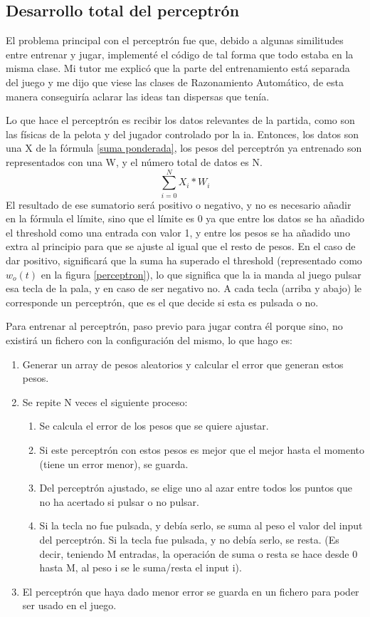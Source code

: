 \subsection{Desarrollo total del perceptrón}
El problema principal con el perceptrón fue que, debido a algunas similitudes entre entrenar y jugar, implementé el código de tal forma que todo estaba en la misma clase. Mi tutor me explicó que la parte del entrenamiento está separada del juego y me dijo que viese las clases de Razonamiento Automático, de esta manera conseguiría aclarar las ideas tan dispersas que tenía.

Lo que hace el perceptrón es recibir los datos relevantes de la partida, como son las físicas de la pelota y del jugador controlado por la \gls{ia}. Entonces, los datos son una X de la fórmula \ref{suma ponderada}, los pesos del perceptrón ya entrenado son representados con una W, y el número total de datos es N.
\begin{equation}
	\sum_{i=0}^NX_{i}*W_{i}
	\label{suma ponderada}
\end{equation}
El resultado de ese sumatorio será positivo o negativo, y no es necesario añadir en la fórmula el límite, sino que el límite es 0 ya que entre los datos se ha añadido el threshold como una entrada con valor 1, y entre los pesos se ha añadido uno extra al principio para que se ajuste al igual que el resto de pesos. En el caso de dar positivo, significará que la suma ha superado el threshold (representado como $w_o(t)$ en la figura \ref{perceptron}), lo que significa que la \gls{ia} manda al juego pulsar esa tecla de la pala, y en caso de ser negativo no. A cada tecla (arriba y abajo) le corresponde un perceptrón, que es el que decide si esta es pulsada o no.

Para entrenar al perceptrón, paso previo para jugar contra él porque sino, no existirá un fichero con la configuración del mismo, lo que hago es:
\begin{enumerate}
	\item Generar un array de pesos aleatorios y calcular el error que generan estos pesos.
	\item Se repite N veces el siguiente proceso:
	\begin{enumerate}
		\item Se calcula el error de los pesos que se quiere ajustar.
		\item Si este perceptrón con estos pesos es mejor que el mejor hasta el momento (tiene un error menor), se guarda.
		\item Del perceptrón ajustado, se elige uno al azar entre todos los puntos que no ha acertado si pulsar o no pulsar. 
		\item Si la tecla no fue pulsada, y debía serlo, se suma al peso el valor del input del perceptrón. Si la tecla fue pulsada, y no debía serlo, se resta. (Es decir, teniendo M entradas, la operación de suma o resta se hace desde 0 hasta M, al peso i se le suma/resta el input i).
	\end{enumerate}
	\item El perceptrón que haya dado menor error se guarda en un fichero para poder ser usado en el juego.
\end{enumerate}

